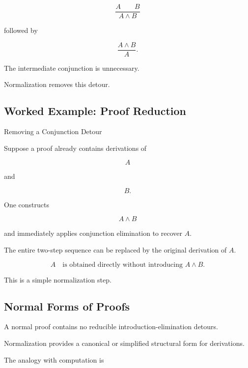 \[
\frac{
A
\qquad
B
}{
A\land B
}
\]

followed by

\[
\frac{
A\land B
}{
A
}.
\]

The intermediate conjunction is unnecessary.

Normalization removes this detour.

\subsection{Worked Example: Proof Reduction}
\label{subsec:worked-proof-reduction}

\begin{workedexamplebox}{Removing a Conjunction Detour}

Suppose a proof already contains derivations of

\[
A
\]

and

\[
B.
\]

One constructs

\[
A\land B
\]

and immediately applies conjunction elimination to recover \(A\).

The entire two-step sequence can be replaced by the original derivation of
\(A\).

\begin{answerbox}
\[
\boxed{
A
\quad\text{is obtained directly without introducing }A\land B.
}
\]
\end{answerbox}

This is a simple normalization step.

\end{workedexamplebox}

\subsection{Normal Forms of Proofs}
\label{subsec:normal-forms-proofs}

A normal proof contains no reducible introduction-elimination detours.

Normalization provides a canonical or simplified structural form for
derivations.

The analogy with computation is


